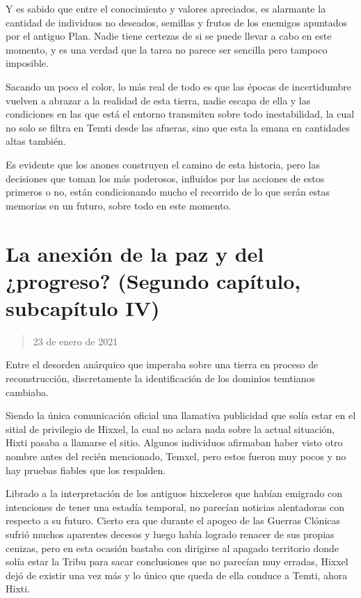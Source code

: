 \documentclass[
  spanish,
]{book}
\begin{document}
Y es sabido que entre el conocimiento y valores apreciados, es alarmante la cantidad de individuos no deseados, semillas y frutos de los enemigos apuntados por el antiguo Plan. Nadie tiene certezas de si se puede llevar a cabo en este momento, y es una verdad que la tarea no parece ser sencilla pero tampoco imposible.

Sacando un poco el color, lo más real de todo es que las épocas de incertidumbre vuelven a abrazar a la realidad de esta tierra, nadie escapa de ella y las condiciones en las que está el entorno transmiten sobre todo inestabilidad, la cual no solo se filtra en Temti desde las afueras, sino que esta la emana en cantidades altas también.

Es evidente que los anones construyen el camino de esta historia, pero las decisiones que toman los más poderosos, influidos por las acciones de estos primeros o no, están condicionando mucho el recorrido de lo que serán estas memorias en un futuro, sobre todo en este momento.

\hypertarget{la-anexiuxf3n-de-la-paz-y-del-progreso-segundo-capuxedtulo-subcapuxedtulo-iv}{%
\section{La anexión de la paz y del ¿progreso? (Segundo capítulo, subcapítulo IV)}\label{la-anexiuxf3n-de-la-paz-y-del-progreso-segundo-capuxedtulo-subcapuxedtulo-iv}}

\begin{quote}
23 de enero de 2021
\end{quote}

Entre el desorden anárquico que imperaba sobre una tierra en proceso de reconstrucción, discretamente la identificación de los dominios temtianos cambiaba.

Siendo la única comunicación oficial una llamativa publicidad que solía estar en el sitial de privilegio de Hixxel, la cual no aclara nada sobre la actual situación, Hixti pasaba a llamarse el sitio. Algunos individuos afirmaban haber visto otro nombre antes del recién mencionado, Temxel, pero estos fueron muy pocos y no hay pruebas fiables que los respalden.

Librado a la interpretación de los antiguos hixxeleros que habían emigrado con intenciones de tener una estadía temporal, no parecían noticias alentadoras con respecto a su futuro. Cierto era que durante el apogeo de las Guerras Clónicas sufrió muchos aparentes decesos y luego había logrado renacer de sus propias cenizas, pero en esta ocasión bastaba con dirigirse al apagado territorio donde solía estar la Tribu para sacar conclusiones que no parecían muy erradas, Hixxel dejó de existir una vez más y lo único que queda de ella conduce a Temti, ahora Hixti.
\end{document}
